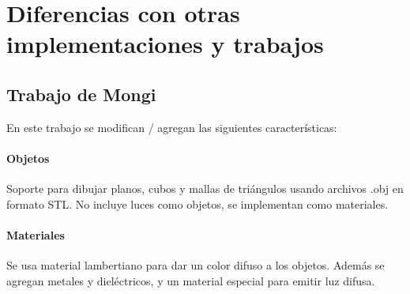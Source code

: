 \section{Diferencias con otras implementaciones y trabajos} \label{sec:diferencias}

\subsection{Trabajo de Mongi}


%

En este trabajo se modifican / agregan las siguientes características:

\paragraph{Objetos} Soporte para dibujar planos, cubos y mallas de triángulos
usando archivos .obj en formato STL. No incluye luces como objetos, se
implementan como materiales.

\paragraph{Materiales} Se usa material lambertiano para dar un color difuso a los
objetos. Además se agregan metales y dieléctricos, y un material especial para
emitir luz difusa.

